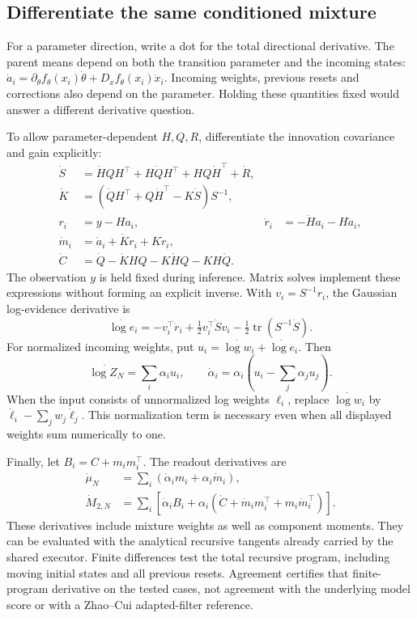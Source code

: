 \subsection{Differentiate the same conditioned mixture}

For a parameter direction, write a dot for the total directional derivative.
The parent means depend on both the transition parameter and the incoming
states: $\dot a_i=\partial_\theta f_\theta(x_i)\dot\theta+
D_xf_\theta(x_i)\dot x_i$. Incoming weights, previous resets and corrections
also depend on the parameter. Holding these quantities fixed would answer a
different derivative question.

To allow parameter-dependent $H,Q,R$, differentiate the innovation covariance
and gain explicitly:
\begin{align}
 \dot S&=\dot H QH^\top+H\dot QH^\top+HQ\dot H^\top+\dot R,\\
 \dot K&=(\dot QH^\top+Q\dot H^\top-K\dot S)S^{-1},\\
 r_i&=y-Ha_i,& \dot r_i&=-\dot H a_i-H\dot a_i,\\
 \dot m_i&=\dot a_i+\dot K r_i+K\dot r_i,\\
 \dot C&=\dot Q-\dot KHQ-K\dot H Q-KH\dot Q.
 \label{eq:parent-condition-tangents}
\end{align}
The observation $y$ is held fixed during inference. Matrix solves implement
these expressions without forming an explicit inverse. With
$v_i=S^{-1}r_i$, the Gaussian log-evidence derivative is
\begin{equation}
 \dot{\log e_i}=-v_i^\top\dot r_i+
 \tfrac12v_i^\top\dot S v_i-\tfrac12\operatorname{tr}(S^{-1}\dot S).
\end{equation}
For normalized incoming weights, put
$u_i=\dot{\log w_i}+\dot{\log e_i}$. Then
\begin{equation}
 \dot{\log Z_N}=\sum_i\alpha_i u_i,\qquad
 \dot\alpha_i=\alpha_i\left(u_i-\sum_j\alpha_j u_j\right).
 \label{eq:parent-weight-tangents}
\end{equation}
When the input consists of unnormalized log weights $\ell_i$, replace
$\dot{\log w_i}$ by
$\dot\ell_i-\sum_jw_j\dot\ell_j$. This normalization term is necessary even
when all displayed weights sum numerically to one.

Finally, let $B_i=C+m_im_i^\top$. The readout derivatives are
\begin{align}
 \dot\mu_N&=\sum_i(\dot\alpha_i m_i+\alpha_i\dot m_i),\\
 \dot M_{2,N}&=\sum_i\left[\dot\alpha_i B_i+
 \alpha_i(\dot C+\dot m_i m_i^\top+m_i\dot m_i^\top)\right].
 \label{eq:parent-readout-tangents}
\end{align}
These derivatives include mixture weights as well as component moments.
They can be evaluated with the analytical recursive tangents already carried
by the shared executor. Finite differences test the total recursive program,
including moving initial states and all previous resets. Agreement certifies
that finite-program derivative on the tested cases, not agreement with the
underlying model score or with a Zhao--Cui adapted-filter reference.

